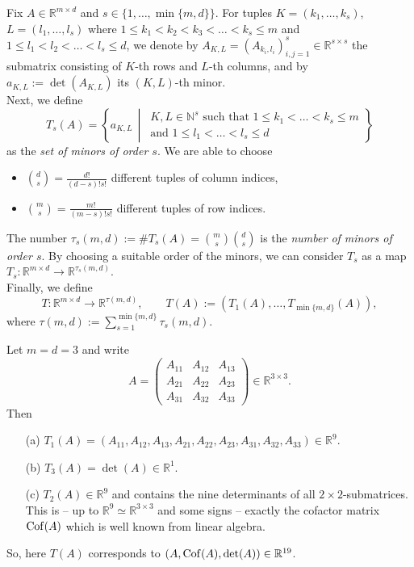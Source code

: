 \begin{notation}
Fix $A\in\mathbb{R}^{m\times d}$ and $s\in\{1,\dotsc,\min\{m,d\}\}$. For tuples $K=(k_1,\dotsc,k_s)$, $L=(l_1,\dotsc,l_s)$ where $1\leq k_1<k_2<k_3<\dotsc<k_s\leq m$ and $1\leq l_1<l_2<\dotsc<l_s\leq d$, we denote by $A_{K,L}=(A_{k_i,l_i})_{i,j=1}^s\in\mathbb{R}^{s\times s}$ the submatrix consisting of $K$-th rows and $L$-th columns, and by $a_{K,L}:=\det(A_{K,L})$ its $(K,L)$-th minor.\\

Next, we define
\[
    T_s(A)=\left\{a_{K,L}\,\middle\vert\,
    \begin{array}{c}
	K,L\in\mathbb{N}^s\text{ such that }1\leq k_1<\dotsc<k_s\leq m\\
	\text{and }1\leq l_1<\dotsc<l_s\leq d
    \end{array}\right\}
\]
as the \textit{set of minors of order $s$}. We are able to choose
\begin{itemize}
	\item $\binom{d}{s}=\frac{d!}{(d-s)!s!}$ different tuples of column indices,
	\item $\binom{m}{s}=\frac{m!}{(m-s)!s!}$ different tuples of row indices.
\end{itemize}
The number $\tau_s(m,d):=\#T_s(A)=\binom{m}{s}\binom{d}{s}$ is the 
\textit{number of minors of order $s$}. By choosing a suitable order 
of the minors, we can consider $T_s$ as a map 
$T_s:\mathbb{R}^{m\times d}\longrightarrow\mathbb{R}^{\tau_s(m,d)}$.\\

Finally, we define
\[
    T:\mathbb{R}^{m\times d}\longrightarrow\mathbb{R}^{\tau(m,d)},
    \qquad T(A):=\left(T_1(A),\dotsc,T_{\min\{m,d\}}(A)\right),
\]
where $\tau(m,d):=\sum_{s=1}^{\min\{m,d\}}{\tau_s(m,d)}$.\\[11pt]
\end{notation}

\begin{example}
Let $m=d=3$ and write
\[
    A=
    \begin{pmatrix}
	A_{11}&A_{12}&A_{13}\\
	A_{21}&A_{22}&A_{23}\\
	A_{31}&A_{32}&A_{33}
    \end{pmatrix}\in\mathbb{R}^{3\times 3}.
\]
Then
\begin{itemize}
	\item[(a)] $T_1(A)=(A_{11},A_{12},A_{13},A_{21},A_{22},A_{23},A_{31},A_{32},A_{33})\in\mathbb{R}^9$.
	\item[(b)] $T_3(A)=\det(A)\in\mathbb{R}^1$.
	\item[(c)] $T_2(A)\in\mathbb{R}^9$ and contains the nine determinants of all $2\times2$-submatrices. This is -- up to $\mathbb{R}^9\simeq\mathbb{R}^{3\times3}$ and some signs -- exactly the cofactor matrix $\operatorname{Cof}\mathopen{}\left(A\right)\mathclose{}$ which is well known from linear algebra.
\end{itemize}
So, here $T(A)$ corresponds to $(A,\operatorname{Cof}\mathopen{}\left(A\right)\mathclose{},\det(A))\in\mathbb{R}^{19}$.
\end{example}


